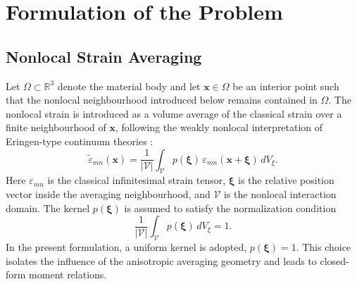 \documentclass[final,3p,times,fleqn]{elsarticle}
\begin{document}
\section{Formulation of the Problem}

\subsection{Nonlocal Strain Averaging}

Let $\Omega\subset\mathbb{R}^{3}$ denote the material body and let
$\mathbf{x}\in\Omega$ be an interior point such that the nonlocal
neighbourhood introduced below remains contained in $\Omega$. The
nonlocal strain is introduced as a volume average of the classical strain
over a finite neighbourhood of $\mathbf{x}$, following the weakly
nonlocal interpretation of Eringen-type continuum theories
\cite{EringenEdelen1972,Eringen1972Polar,Eringen1983}:
\begin{equation}\label{eq:nonlocal_strain}
    \tilde{\varepsilon}_{mn}(\mathbf{x})
    =
    \frac{1}{|\mathcal{V}|}
    \int_{\mathcal{V}}
    p(\boldsymbol{\xi})\,
    \varepsilon_{mn}(\mathbf{x}+\boldsymbol{\xi})\,dV_{\xi}.
\end{equation}
Here $\varepsilon_{mn}$ is the classical infinitesimal strain tensor,
$\boldsymbol{\xi}$ is the relative position vector inside the averaging
neighbourhood, and $\mathcal{V}$ is the nonlocal interaction domain.
The kernel $p(\boldsymbol{\xi})$ is assumed to satisfy the normalization
condition
\begin{equation}\label{eq:kernel_normalization}
    \frac{1}{|\mathcal{V}|}
    \int_{\mathcal{V}}p(\boldsymbol{\xi})\,dV_{\xi}
    =
    1 .
\end{equation}
In the present formulation, a uniform kernel is adopted,
$p(\boldsymbol{\xi})=1$. This choice isolates the influence of the
anisotropic averaging geometry and leads to closed-form moment
relations.
\end{document}

